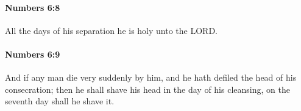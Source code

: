 		\paragraph{Numbers 6:8} %
			\label{NUMBERS-6-8}

			All the days of his separation he is holy unto the LORD.


		\paragraph{Numbers 6:9} %
			\label{NUMBERS-6-9}

			And if any man die very suddenly by him, and he hath defiled the head of his consecration; then he shall shave his head in the day of his cleansing, on the seventh day shall he shave it.



